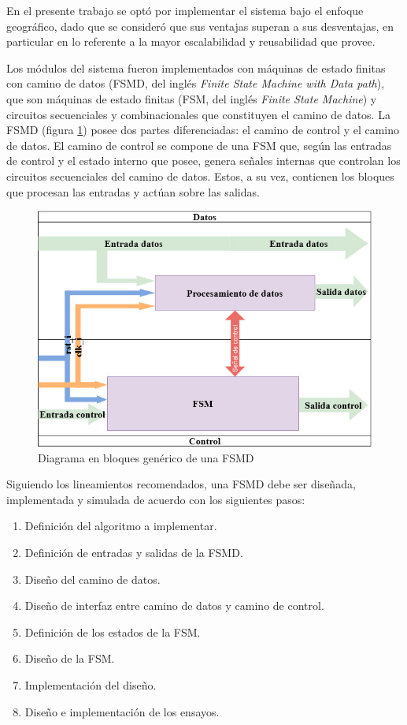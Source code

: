 	En el presente trabajo se optó por implementar el sistema bajo el enfoque geográfico, dado que se consideró que sus ventajas superan a sus desventajas, en particular en lo referente a la mayor escalabilidad y reusabilidad que provee.

	Los módulos del sistema fueron implementados con máquinas de estado finitas con camino de datos (FSMD, del inglés \textit{Finite State Machine with Data path}), que son máquinas de estado finitas (FSM, del inglés \textit{Finite State Machine}) y circuitos secuenciales y combinacionales que constituyen el camino de datos. La FSMD (figura \ref{fig:FSMD}) posee dos partes diferenciadas: el camino de control y el camino de datos. El camino de control se compone de una FSM que, según las entradas de control y el estado interno que posee, genera señales internas que controlan los circuitos secuenciales del camino de datos. Estos, a su vez, contienen los bloques que procesan las entradas y actúan sobre las salidas.

	\begin{figure}[h]
	\centering
		\includegraphics[scale=.55]{./Figures/FSMD}
		\caption{Diagrama en bloques genérico de una FSMD}
		\label{fig:FSMD}
	\end{figure}
	
	
	Siguiendo los lineamientos recomendados, una FSMD debe ser diseñada, implementada y simulada de acuerdo con los siguientes pasos:
	
	\begin{enumerate}
		\item Definición del algoritmo a implementar.
		\item Definición de entradas y salidas de la FSMD.
		\item Diseño del camino de datos.
		\item Diseño de interfaz entre camino de datos y camino de control.
		\item Definición de los estados de la FSM.
		\item Diseño de la FSM.
		\item Implementación del diseño.
		\item Diseño e implementación de los ensayos.
	\end{enumerate}
	
